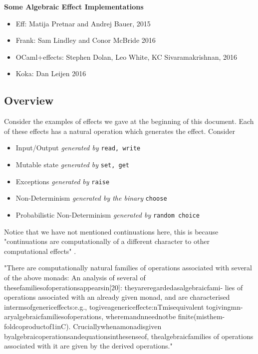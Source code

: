 \textbf{Some Algebraic Effect Implementations}
\begin{itemize}
    \item Eff: Matija Pretnar and Andrej Bauer,
        2015\cite{bauer2015programming}
    \item Frank: Sam Lindley and Conor McBride
        2016\cite{Lindley:2016vz}
    \item OCaml+effects: Stephen Dolan, Leo White, KC Sivaramakrishnan,
        2016\cite{ocamlplseff}
    \item Koka: Dan Leijen
        2016\cite{leijen:16}
\end{itemize}

\subsection{Overview}

\begin{example}
    Consider the examples of effects we gave at the beginning of this document.
    Each of these effects has a natural operation which generates the effect.
    Consider
    \begin{itemize}
        \item Input/Output \textit{generated by} \texttt{read, write}
        \item Mutable state \textit{generated by} \texttt{set, get}
        \item Exceptions \textit{generated by} \texttt{raise}
        \item Non-Determinism \textit{generated by the binary} \texttt{choose}
        \item Probabilistic Non-Determinism \textit{generated by} \texttt{random choice}
    \end{itemize}
\end{example}

Notice that we have not mentioned continuations here,
this is because
"continuations are computationally of a different character to other computational effects"
\cite{Plotkin:2002dw}.

"There are computationally natural families of operations associated with several of the above monads:
An analysis of several of thesefamiliesofoperationsappearsin[20]:
theyareregardedasalgebraicfami- lies of operations associated with an already given monad,
and are characterised intermsofgenericeffects:e.g.,
togiveagenericeffecte:nTmisequivalent togivingmn-aryalgebraicfamiliesofoperations,
wheremandnneednotbe finite(misthem-foldcoproductof1inC).
Cruciallywhenamonadisgiven byalgebraicoperationsandequationsinthesenseof,
thealgebraicfamilies of operations associated with it are given by the derived operations."
\cite{Plotkin:2002dw}

